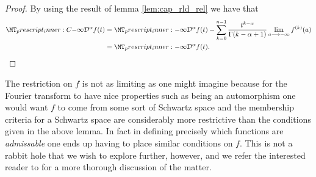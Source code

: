 \begin{proof}
    By using the result of lemma \ref{lem:cap_rld_rel} we have that
    \begin{align}
        \prescript{C}{-\infty}{\mathcal{D}}^\alpha f(t) &= \prescript{}{-\infty}{\mathcal{D}}^\alpha f(t) - \sum_{k=0}^{n-1} \frac{t^{k-\alpha}}{\Gamma(k - \alpha + 1)}\lim_{a \lra -\infty}f^{(k)}(a) \\
    &=  \prescript{}{-\infty}{\mathcal{D}}^\alpha f(t). 
    \end{align}
\end{proof}
The restriction on $ f $ is not as limiting as one might imagine because for the Fourier transform to have nice properties such as being an automorphism one would want $ f $ to come from some sort of Schwartz space and the membership criteria for a Schwartz space are considerably more restrictive than the conditions given in the above lemma. In fact in defining precisely which functions are \emph{admissable} one ends up having to place similar conditions on $ f $. This is not a rabbit hole that we wish to explore further, however, and we refer the interested reader to \cite{Samko1993} for a more thorough discussion of the matter. 
\clearpage

